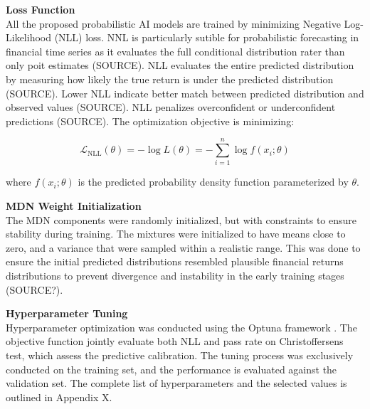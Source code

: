 




\textbf{Loss Function} \\
All the proposed probabilistic AI models are trained by minimizing Negative Log-Likelihood (NLL) loss. NNL is particularly sutible for probabilistic forecasting in financial time series as it evaluates the full conditional distribution rater than only poit estimates (SOURCE). NLL evaluates the entire predicted distribution by measuring how likely the true return is under the predicted distribution (SOURCE). Lower NLL indicate better match between predicted distribution and observed values (SOURCE). NLL penalizes overconfident or underconfident predictions (SOURCE). The optimization objective is minimizing: 


\begin{equation}
    \mathcal{L}_{\text{NLL}}(\theta) = - \log L(\theta) = - \sum_{i=1}^n \log f(x_i; \theta)
\end{equation}

where $f(x_i; \theta)$ is the predicted probability density function parameterized by $\theta$.

\textbf{MDN Weight Initialization} \\
The MDN components were randomly initialized, but with constraints to ensure stability during training. The mixtures were initialized to have means close to zero, and a variance that were sampled within a realistic range. This was done to ensure the initial predicted distributions resembled plausible financial returns distributions to prevent divergence and instability in the early training stages (SOURCE?). 

\textbf{Hyperparameter Tuning} \\
Hyperparameter optimization was conducted using the Optuna framework \parencite{akiba2019optuna}. The objective function jointly evaluate both NLL and pass rate on Christoffersens test, which assess the predictive calibration. The tuning process was exclusively conducted on the training set, and the performance is evaluated against the validation set. The complete list of hyperparameters and the selected values is outlined in Appendix X.  

